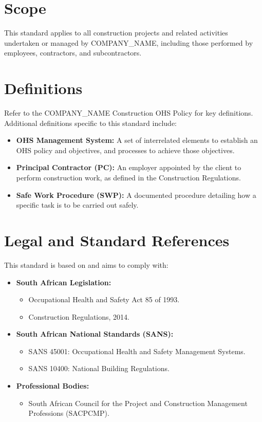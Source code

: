 \documentclass[12pt]{article}
\begin{document}
\section{Scope}
This standard applies to all construction projects and related activities undertaken or managed by {{COMPANY_NAME}}, including those performed by employees, contractors, and subcontractors.

\section{Definitions}
Refer to the {{COMPANY_NAME}} Construction OHS Policy for key definitions. Additional definitions specific to this standard include:
\begin{itemize}
    \item \textbf{OHS Management System:} A set of interrelated elements to establish an OHS policy and objectives, and processes to achieve those objectives.
    \item \textbf{Principal Contractor (PC):} An employer appointed by the client to perform construction work, as defined in the Construction Regulations.
    \item \textbf{Safe Work Procedure (SWP):} A documented procedure detailing how a specific task is to be carried out safely.
\end{itemize}

\section{Legal and Standard References}
This standard is based on and aims to comply with:
\begin{itemize}
    \item \textbf{South African Legislation:}
    \begin{itemize}
        \item Occupational Health and Safety Act 85 of 1993.
        \item Construction Regulations, 2014.
    \end{itemize}
    \item \textbf{South African National Standards (SANS):}
    \begin{itemize}
        \item SANS 45001: Occupational Health and Safety Management Systems.
        \item SANS 10400: National Building Regulations.
    \end{itemize}
    \item \textbf{Professional Bodies:}
    \begin{itemize}
        \item South African Council for the Project and Construction Management Professions (SACPCMP).
    \end{itemize}
\end{itemize}
\end{document}

